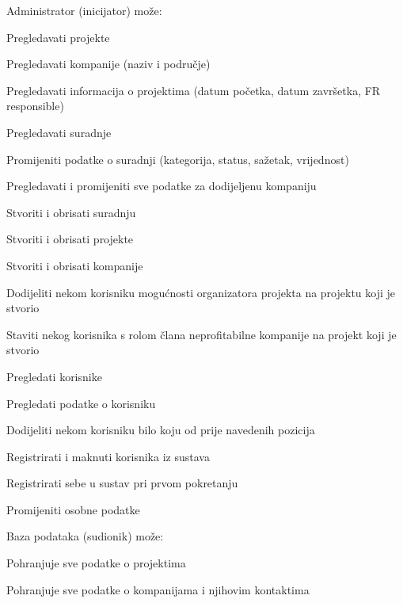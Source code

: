 \begin{packed_enum}
\begin{packed_enum}
				\end{packed_enum}

				\item {Administrator (inicijator) može:}

				\begin{packed_enum}

					\item Pregledavati projekte
					\item Pregledavati kompanije (naziv i područje)
					\item Pregledavati informacija o projektima (datum početka, datum završetka, FR responsible)
					\item Pregledavati suradnje
					\item Promijeniti podatke o suradnji (kategorija, status, sažetak, vrijednost)
					\item Pregledavati i promijeniti sve podatke za dodijeljenu kompaniju
					\item Stvoriti i obrisati suradnju
					\item Stvoriti i obrisati projekte
					\item Stvoriti i obrisati kompanije
					\item Dodijeliti nekom korisniku mogućnosti organizatora projekta na projektu koji je stvorio
					\item Staviti nekog korisnika s rolom člana neprofitabilne kompanije na projekt koji je stvorio
					\item Pregledati korisnike
					\item Pregledati podatke o korisniku
					\item Dodijeliti nekom korisniku bilo koju od prije navedenih pozicija
					\item Registrirati i maknuti korisnika iz sustava
					\item Registrirati sebe u sustav pri prvom pokretanju
					\item Promijeniti osobne podatke

				\end{packed_enum}
			
				\item {Baza podataka (sudionik) može:}
				
				\begin{packed_enum}
					
					\item Pohranjuje sve podatke o projektima
					\item Pohranjuje sve podatke o kompanijama i njihovim kontaktima
					
				\end{packed_enum}

			\end{packed_enum}
			
